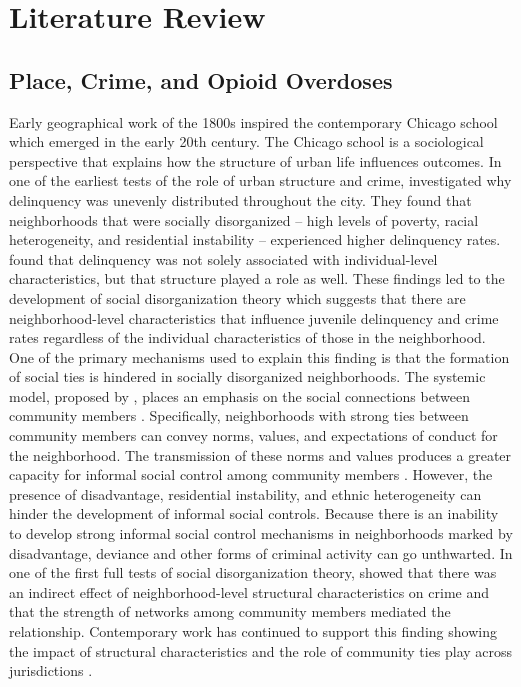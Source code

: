 \section{\centering Literature Review}

\subsection{Place, Crime, and Opioid Overdoses}

Early geographical work of the 1800s inspired the contemporary Chicago school which emerged in the early 20th century. The Chicago school is a sociological perspective that explains how the structure of urban life influences outcomes. In one of the earliest tests of the role of urban structure and crime, \textcite{shaw_juvenile_1942} investigated why delinquency was unevenly distributed throughout the city. They found that neighborhoods that were socially disorganized – high levels of poverty, racial heterogeneity, and residential instability – experienced higher delinquency rates. \textcite{shaw_juvenile_1942} found that delinquency was not solely associated with individual-level characteristics, but that structure played a role as well. These findings led to the development of social disorganization theory which suggests that there are neighborhood-level characteristics that influence juvenile delinquency and crime rates regardless of the individual characteristics of those in the neighborhood. One of the primary mechanisms used to explain this finding is that the formation of social ties is hindered in socially disorganized neighborhoods. The systemic model, proposed by \textcite{kasarda_community_1974}, places an emphasis on the social connections between community members \parencite{bursik_jr_economic_1993, bursik_systemic_2000}. Specifically, neighborhoods with strong ties between community members can convey norms, values, and expectations of conduct for the neighborhood. The transmission of these norms and values produces a greater capacity for informal social control among community members \parencite{kornhauser_social_1978}. However, the presence of disadvantage, residential instability, and ethnic heterogeneity can hinder the development of informal social controls. Because there is an inability to develop strong informal social control mechanisms in neighborhoods marked by disadvantage, deviance and other forms of criminal activity can go unthwarted. In one of the first full tests of social disorganization theory, \textcite{sampson_community_1989} showed that there was an indirect effect of neighborhood-level structural characteristics on crime and that the strength of networks among community members mediated the relationship. Contemporary work has continued to support this finding showing the impact of structural characteristics and the role of community ties play across jurisdictions \parencite{bursik_systemic_2000, levy_triple_2020, sampson_great_2012, sampson_neighborhoods_1997}.

